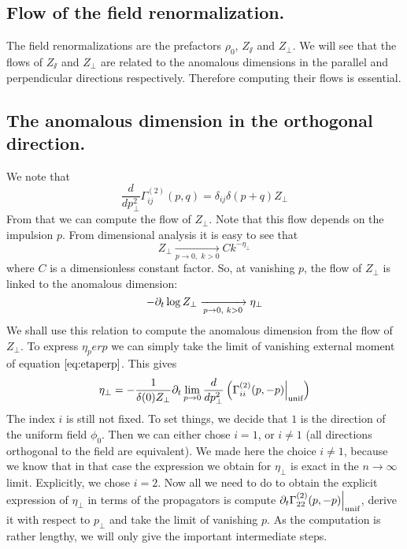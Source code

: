 \subsection{Flow of the field renormalization.}

The field renormalizations are the prefactors $\rho_0$, $Z_\sslash$ and $Z_\perp$. We will see that the flows of $Z_\sslash$ and $Z_\perp$  are related to the anomalous dimensions in the parallel and perpendicular directions respectively. Therefore computing their flows is essential. 

\subsection{The anomalous dimension in the orthogonal direction.}

We note that
\begin{equation}
\label{eq:etaperp}
\frac{d}{dp_\perp^2} \Gamma^{(2)}_{ij}(p,q) = \delta_{ij} \delta(p+q) Z_\perp
\end{equation}
From that we can compute the flow of $Z_\perp$. Note that this flow depends on the impulsion $p$. From dimensional analysis it is easy to see that
\begin{equation}
 Z_\perp \xrightarrow[p \rightarrow 0,\text{~} k>0]{} C k^{-\eta_\perp}
 \end{equation} 
 where $C$ is a dimensionless constant factor. So, at vanishing $p$, the flow of $Z_\perp$ is linked to the anomalous dimension:
 \begin{equation}
 - \partial_{t} \log Z_\perp \xrightarrow[p \rightarrow 0,\text{~} k>0]{} \eta_\perp
 \end{equation}
 We shall use this relation to compute the anomalous dimension from the flow of $Z_\perp$.
 To express $\eta_perp$ we can simply take the limit of vanishing external moment of equation $\ref{eq:etaperp}$. This gives
\begin{equation}
\eta_\perp = -\frac{1}{\delta(0) Z_\perp} \partial_{t} \lim_{p \rightarrow 0} \frac{d}{dp_\perp^2} \left( \Gamma^{(2)}_{ii}(p,-p)  \Big|_{\text{unif}}  \right)
\end{equation}
The index $i$ is still not fixed. To set things, we decide that $1$ is the direction of the uniform field $\phi_0$. Then we can either chose $i=1$, or $i \neq 1$ (all directions orthogonal to the field are equivalent). We made here the choice $i \neq 1$, because we know that in that case the expression we obtain for $\eta_\perp$ is exact in the $n \rightarrow \infty$ limit. Explicitly, we chose $i=2$.
Now all we need to do to obtain the explicit expression of $\eta_\perp$ in terms of the propagators is compute $\partial_{t} \Gamma^{(2)}_{22}(p,-p)  \Big|_{\text{unif}} $, derive it with respect to $p_\perp$ and take the limit of vanishing $p$. As the computation is rather lengthy, we will only give the important intermediate steps.

